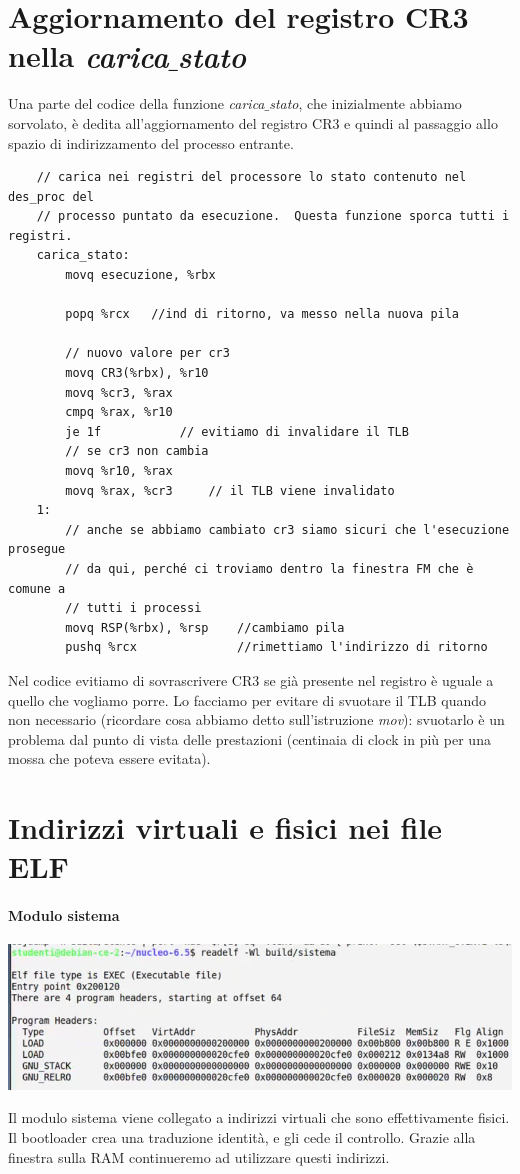 \documentclass[11pt]{report}
\theoremstyle{definition}
\begin{document}
\section{Aggiornamento del registro CR3 nella \emph{carica$\_$stato}} Una parte del codice della funzione \emph{carica$\_$stato}, che inizialmente abbiamo sorvolato, è dedita all'aggiornamento del registro CR3 e quindi al passaggio allo spazio di indirizzamento del processo entrante.
\small
\begin{verbatim}
	// carica nei registri del processore lo stato contenuto nel des_proc del
	// processo puntato da esecuzione.  Questa funzione sporca tutti i registri.
	carica_stato:
	    movq esecuzione, %rbx
	
	    popq %rcx   //ind di ritorno, va messo nella nuova pila
	
	    // nuovo valore per cr3
	    movq CR3(%rbx), %r10
	    movq %cr3, %rax
	    cmpq %rax, %r10
	    je 1f			// evitiamo di invalidare il TLB
	    // se cr3 non cambia
	    movq %r10, %rax
	    movq %rax, %cr3		// il TLB viene invalidato
	1:
	    // anche se abbiamo cambiato cr3 siamo sicuri che l'esecuzione prosegue
	    // da qui, perché ci troviamo dentro la finestra FM che è comune a
	    // tutti i processi
	    movq RSP(%rbx), %rsp    //cambiamo pila
	    pushq %rcx              //rimettiamo l'indirizzo di ritorno
\end{verbatim}
\normalsize 
Nel codice evitiamo di sovrascrivere CR3 se già presente nel registro è uguale a quello che vogliamo porre. Lo facciamo per evitare di svuotare il TLB quando non necessario (ricordare cosa abbiamo detto sull'istruzione \emph{mov}): svuotarlo è un problema dal punto di vista delle prestazioni (centinaia di clock in più per una mossa che poteva essere evitata).


\section{Indirizzi virtuali e fisici nei file ELF}
\paragraph{Modulo sistema}
\begin{center}
	\includegraphics[scale=.75]{img/252.PNG}
\end{center}
Il modulo sistema viene collegato a indirizzi virtuali che sono effettivamente fisici. Il bootloader crea una traduzione identità, e gli cede il controllo. Grazie alla finestra sulla RAM continueremo ad utilizzare questi indirizzi. 
\end{document}
